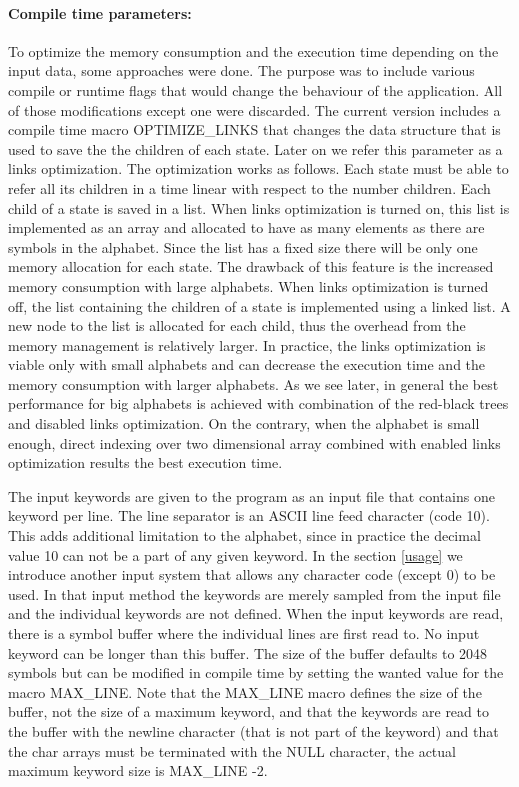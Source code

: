 \documentclass[english,twoside,censored,csm,algorithms-track-2020]{HYthesisML}
\theoremstyle{plain}
\theoremstyle{definition}
\begin{document}
\paragraph{Compile time parameters:}
To optimize the memory consumption and the execution time depending on the input data, some approaches
were done. The purpose was to include various compile or runtime flags that would change the behaviour
of the application. All of those modifications except one were discarded. The current version includes
a compile time macro OPTIMIZE\_LINKS that changes the data structure that is used to save the the children of each
state. Later on we refer this parameter as a links optimization. The optimization works as follows.
Each state must be able to refer all its children in a time linear with respect to the number children.
Each child of a state is saved in a list. When links optimization is turned on, this list is
implemented as an array and allocated
to have as many elements as there are symbols in the alphabet. Since the list has a fixed size there
will be only one memory allocation for each state. The drawback of this feature is the increased memory
consumption with large alphabets. When links optimization is turned off, the list containing the
children of a state is implemented using a linked list. A new node to the list is allocated for each
child, thus the overhead from the memory management is relatively larger. In practice, the links
optimization is viable only with small alphabets and can decrease the execution time and the memory
consumption with larger alphabets. As we see later, in general the best performance for big alphabets
is achieved with combination of the red-black trees and disabled links optimization. On the contrary,
when the alphabet is small enough, direct indexing over two dimensional array combined with enabled links
optimization results the best execution time.

The input keywords are given to the program as an input file that contains one keyword per line. The
line separator is an ASCII line feed character (code 10). This adds additional limitation to the
alphabet, since in practice the decimal value 10 can not be a part of any given keyword. In the section
\ref{usage} we introduce another input system that allows any character code (except 0) to be used. In
that input method the keywords are merely sampled from the input file and the individual keywords
are not defined. When the input keywords are read, there is a symbol buffer where the individual lines
are first read to. No input keyword can be longer than this buffer. The size of the buffer defaults
to 2048 symbols but can be modified in compile time by setting the wanted value for the macro
MAX\_LINE.
Note that the MAX\_LINE macro defines the size of the buffer, not the size of a maximum
keyword, and
that the keywords are read to the buffer with the newline character (that is not part of the keyword)
and that the char arrays must be terminated with the NULL character, the actual maximum
keyword size is MAX\_LINE -2.
\end{document}

